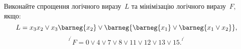 %
%
^^I^^IВиконайте спрощення логічного виразу~$L$ та мінімізацію логічного виразу~$F$, якщо:
^^I^^I\[
^^I^^I^^IL = x_3x_2 \lor x_3 \barneg{x_2} \lor \barneg{\barneg{x_1} \lor \barneg{x_1 \lor x_2} },
^^I^^I\]
^^I^^I\[
^^I^^I^^IF = 0 \lor 4 \lor 7 \lor 8 \lor 11 \lor 12 \lor 13 \lor 15.
^^I^^I\]
